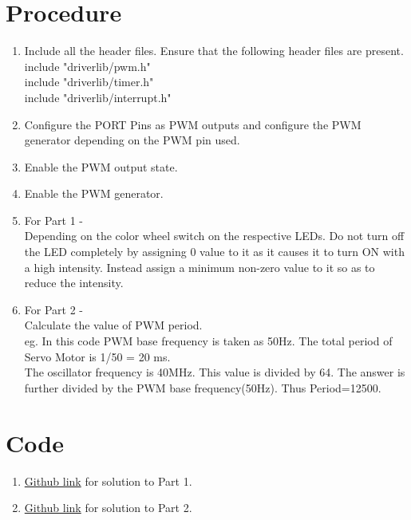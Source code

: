 \documentclass[a4paper,12pt,oneside]{book}
\begin{document}
\section{Procedure}
\begin{enumerate}
\item Include all the header files. Ensure that the following header files are present.\\
 include "driverlib/pwm.h"\\
 include "driverlib/timer.h"\\
 include "driverlib/interrupt.h"
 \item Configure the PORT Pins as PWM outputs and configure the PWM generator depending on the PWM pin used.
 \item  Enable the PWM output state.
 \item  Enable the PWM generator. 
\item For Part 1 - \\Depending on the color wheel switch on the respective LEDs. Do not turn off the LED completely by assigning 0 value to it as it causes it to turn ON with a high intensity. Instead assign a minimum non-zero value to it so as to reduce the intensity.   

\item For Part 2 - \\Calculate the value of PWM period. \\
eg. In this code PWM base frequency is taken as 50Hz. The total period of Servo Motor is 1/50 = 20 ms. \\ 
The oscillator frequency is 40MHz. This value is divided by 64. The answer is further divided by the PWM base frequency(50Hz).
Thus Period=12500. 
\end{enumerate}

\section{Code}
\begin{enumerate}
\item \href{https://github.com/eYSIP-2016/eYSIP-2016-Around-the-world-of-Embedded-Systems/blob/origin/master/Solutions/lab3\%20solutions/lab3_solution1.c}{Github link} for solution to Part 1.
\item \href{https://github.com/eYSIP-2016/eYSIP-2016-Around-the-world-of-Embedded-Systems/blob/origin/master/Solutions/lab3\%20solutions/lab3_solution2.c}{Github link} for solution to Part 2.
\end{enumerate}
\end{document}
